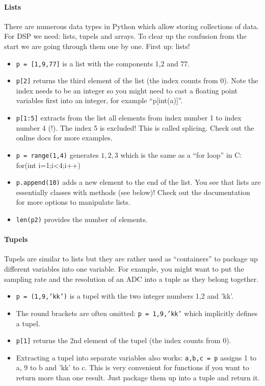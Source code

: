 \documentclass[12pt,a4paper]{article}
\begin{document}
\paragraph{Lists}
There are numerous data types in Python which allow storing
collections of data. For DSP we need: lists, tupels and arrays. To clear
up the confusion from the start we are going through them one
by one. First up: lists!
\begin{itemize}
\item \texttt{p~=~[1,9,77]} is a list with the components 1,2 and 77.
\item \texttt{p[2]} returns the third element of the list (the index
  counts from 0). Note the index needs to be an integer so you might
  need to cast a floating point variables first into an integer, for example
  ``p[int(a)]''.
\item \texttt{p[1:5]} extracts from the list all elements from
  index number 1 to index number 4 (!). The index 5 is excluded!
  This is called splicing. Check out the online docs
  for more examples.
\item \texttt{p~=~range(1,4)} generates $1, 2, 3$ which is the same as
  a ``for loop'' in C: for(int i=1;i<4;i++)
\item \texttt{p.append(10)} adds a new element to the end of the
  list. You see that lists are essentially classes with methods (see below)!
  Check out the documentation for more options to manipulate lists.
\item \texttt{len(p2)} provides the number of elements.
\end{itemize}

\paragraph{Tupels}
Tupels are similar to lists but they are rather used as
``containers'' to package up different variables into one variable. For
example, you might want to put the sampling rate and the resolution of
an ADC into a tuple as they belong together.
\begin{itemize}
\item \texttt{p~=~(1,9,'kk')} is a tupel with the two integer numbers 1,2 and 'kk'.
\item The round brackets are often omitted:
  \texttt{p~=~1,9,'kk'} which implicitly defines a tupel.
\item \texttt{p[1]} returns the 2nd element of the tupel (the index
  counts from 0).
\item Extracting a tupel into separate variables also works:
  \texttt{a,b,c = p} assigns 1 to a, 9 to b and 'kk' to c. This
  is very convenient for functions if you want to return more than
  one result. Just package them up into a tuple and return it.
\end{itemize}
\end{document}
